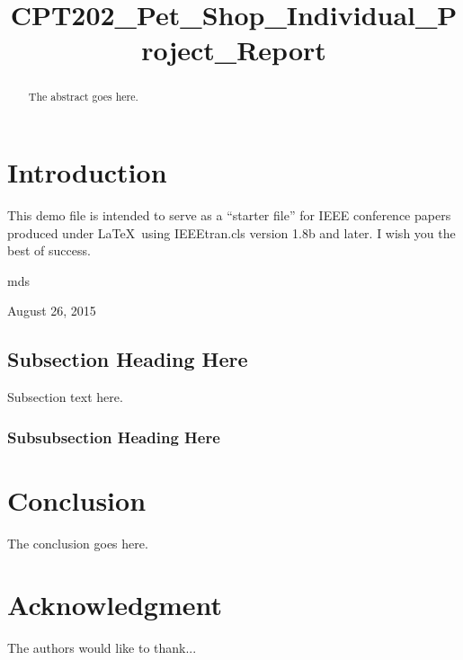 \documentclass[conference]{IEEEtran}
\begin{document}
\title{CPT202\_Pet\_Shop\_Individual\_Project\_Report}


\author{
}
\maketitle


\begin{abstract}
The abstract goes here.
\end{abstract}

\IEEEpeerreviewmaketitle

\section{Introduction}
This demo file is intended to serve as a ``starter file''
for IEEE conference papers produced under \LaTeX\ using
IEEEtran.cls version 1.8b and later.
I wish you the best of success.

\hfill mds
 
\hfill August 26, 2015

\subsection{Subsection Heading Here}
Subsection text here.


\subsubsection{Subsubsection Heading Here}


\section{Conclusion}
The conclusion goes here.


\section*{Acknowledgment}
The authors would like to thank...









\end{document}
